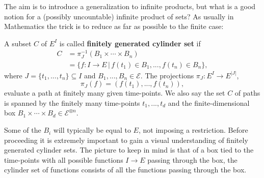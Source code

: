 The aim is to introduce a generalization to infinite products, but what is a good notion for a (possibly uncountable) infinite product of sets?
As usually in Mathematics the trick is to reduce as far as possible to the finite case:
\begin{ldef}
	\begin{deff}
		A subset $C$ of $E^I$ is called \textbf{finitely generated cylinder set} if 
		\begin{align*}
			C&=\pi_{J}^{-1}(B_1\times \cdots \times B_n)\\
			&=\{f:I\to E\,|\, f(t_1)\in B_1, ..., f(t_n)\in B_n\},
		\end{align*}
		where $J=\{t_1,...,t_n\}\subseteq I$ and $B_1,...,B_n\in \mathcal E$. The projections $\pi_J:E^I\to E^{|J|}$,  $$\pi_{J}(f)=(f(t_1),...,f(t_n)),$$ evaluate a path at finitely many given time-points. We also say the set $C$ of paths is spanned by the finitely many time-points $t_1,...,t_d$ and the finite-dimensional box $B_1\times \cdots \times B_d \in \mathcal E^{\otimes n}$.	
	\end{deff}
\end{ldef}
Some of the $B_i$ will typically be equal to $E$, not imposing a restriction. Before proceeding it is extremely important to gain a visual understanding of  finitely generated cylinder sets. The picture to keep in mind is that of a box tied to the time-points with all possible functions $I\to E$ passing through the box, the cylinder set of functions consists of all the functions passing through the box. 
